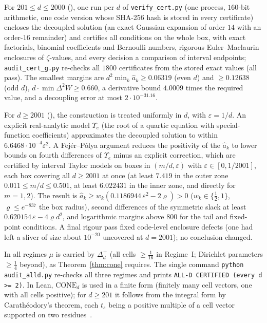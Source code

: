 \documentclass[11pt]{article}
\theoremstyle{remark}
\numberwithin{equation}{section}
\newcommand{\CONE}{\mathrm{CONE}}
\begin{document}
For $201\le d\le2000$ \textup{(\cite[Proposition~6.6]{MSmath})}, one run per $d$ of \texttt{verify\_cert.py} (one
process, $160$-bit arithmetic, one code version whose SHA-256 hash is stored in every certificate) encloses the
decoupled solution (an exact Gaussian expansion of order $14$ with an order-$16$ remainder) and certifies all conditions
on the whole box, with exact factorials, binomial coefficients and Bernoulli numbers, rigorous Euler--Maclaurin
enclosures of $\zeta$-values, and every decision a comparison of interval endpoints; \texttt{audit\_cert\_g.py} re-checks
all $1800$ certificates from the stored exact values (all pass). The smallest margins are $d^2\min_k\hat a_k\ge0.06319$
(even $d$) and $\ge0.12638$ (odd $d$), $d\cdot\min\Delta^2W\ge0.660$, a derivative bound $4.0009$ times the required
value, and a decoupling error at most $2\cdot10^{-31.16}$.

For $d\ge2001$ \textup{(\cite[Proposition~6.8 and Appendix~A]{MSmath})}, the construction is treated uniformly in $d$,
with $\varepsilon=1/d$. An explicit real-analytic model $\Upsilon_e$ (the root of a quartic equation with special-function
coefficients) approximates the decoupled solution to within $6.6468\cdot10^{-4}\varepsilon^2$. A Fej\'er--P\'olya argument
reduces the positivity of the $\hat a_k$ to lower bounds on fourth differences of $\Upsilon_e$ minus an explicit
correction, which are certified by interval Taylor models on boxes in $(m/d,\varepsilon)$ with
$\varepsilon\in[0,1/2001]$, each box covering all $d\ge2001$ at once (at least $7.419$ in the outer zone
$0.011\le m/d\le0.501$, at least $6.022431$ in the inner zone, and directly for $m=1,2$). The result is
$\hat a_k\ge w_k(0.1186944\,\varepsilon^2-2\varrho)>0$ ($w_k\in\{\frac12,1\}$, $\varrho\le e^{-837}$ the box radius),
second differences of the symmetric slack at least $0.620154\,\varepsilon-4\varrho d^2$, and logarithmic margins above
$800$ for the tail and fixed-point conditions. A final rigour pass fixed code-level enclosure defects (one had left a
sliver of size about $10^{-20}$ uncovered at $d=2001$); no conclusion changed.

In all regimes $\mu$ is carried by $\Delta_d^+$ (all cells $\ge\frac1{16}$ in Regime~I; Dirichlet parameters $\ge\frac14$
beyond), as Theorem~\ref{thm:cone} requires. The single command \texttt{python audit\_alld.py} re-checks all three regimes
and prints \texttt{ALL-D CERTIFIED (every d >= 2)}. In Lean, $\CONE_d$ is used in a finite form (finitely many cell
vectors, one with all cells positive); for $d\ge201$ it follows from the integral form by Carath\'eodory's theorem, each
$t_s$ being a positive multiple of a cell vector supported on two residues~\cite[Remark~11.1]{MSmath}.
\end{document}
